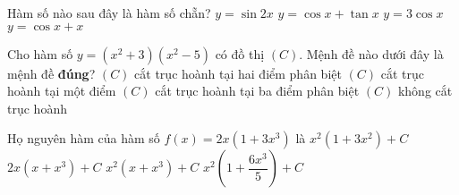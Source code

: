 \begin{ex}%
	Hàm số nào sau đây là hàm số chẵn? 
	\choice
	{ $y=\sin 2x$}
	{$y=\cos x+\tan x$}
	{\True $y=3\cos x $}
	{$y=\cos x+x$}
\end{ex}
\begin{ex}%
	Cho hàm số $y=\left( {{x}^{2}}+3 \right)\left( {{x}^{2}}-5 \right)$ có đồ thị $\left( C \right)$. Mệnh đề nào dưới đây là mệnh đề \textbf{đúng}?
	\choice
	{ \True $\left( C \right)$ cắt trục hoành tại hai điểm phân biệt}
	{$\left( C \right)$ cắt trục hoành tại một điểm}
	{$\left( C \right)$ cắt trục hoành tại ba điểm phân biệt}
	{$\left( C \right)$ không cắt trục hoành}
\end{ex}
\begin{ex}%
Họ nguyên hàm của hàm số $f(x)=2x\left(1+3x^3\right)$ là
\choice
{$x^2\left(1+3x^2\right)+C$}
{$2x\left(x+x^3\right)+C$}
{$x^2\left(x+x^3\right)+C$}
{\True $x^2\left(1+\dfrac{6x^3}{5}\right)+C$}
\end{ex}

